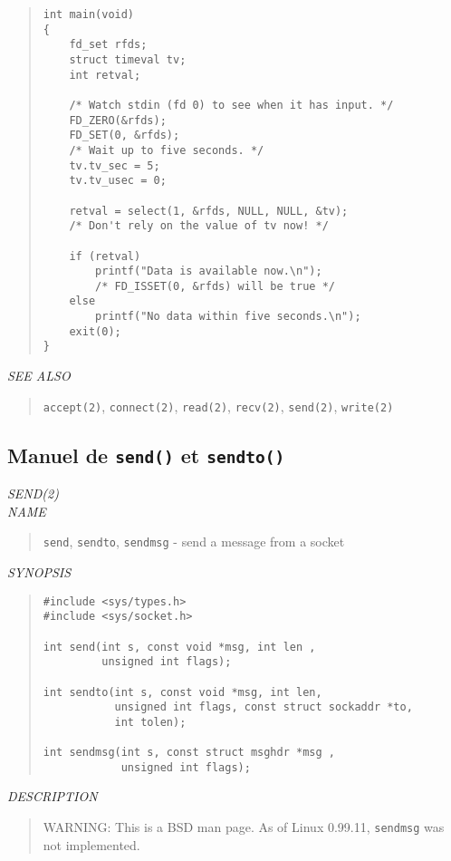 \begin{appendix}
\begin{english}
\begin{quote}
\begin{verbatim}
int main(void)
{
    fd_set rfds;
    struct timeval tv;
    int retval;

    /* Watch stdin (fd 0) to see when it has input. */
    FD_ZERO(&rfds);
    FD_SET(0, &rfds);
    /* Wait up to five seconds. */
    tv.tv_sec = 5;
    tv.tv_usec = 0;

    retval = select(1, &rfds, NULL, NULL, &tv);
    /* Don't rely on the value of tv now! */

    if (retval)
        printf("Data is available now.\n");
        /* FD_ISSET(0, &rfds) will be true */
    else
        printf("No data within five seconds.\n");
    exit(0);
}
\end{verbatim}
\end{quote}

{\sl SEE ALSO}
\begin{quote}
	{\tt accept(2)}, {\tt connect(2)}, {\tt read(2)}, {\tt recv(2)},
	{\tt send(2)}, {\tt write(2)}
\end{quote}
\end{english}


\subsection{Manuel de {\tt send()} et {\tt sendto()}}
\begin{english}
{\sl SEND(2)}\\

{\sl NAME}
\begin{quote}
	{\tt send}, {\tt sendto}, {\tt sendmsg} - send a message from a socket
\end{quote}

{\sl SYNOPSIS}
\begin{quote}
\begin{verbatim}
#include <sys/types.h>
#include <sys/socket.h>

int send(int s, const void *msg, int len ,
         unsigned int flags);

int sendto(int s, const void *msg, int len,
           unsigned int flags, const struct sockaddr *to,
           int tolen);

int sendmsg(int s, const struct msghdr *msg ,
            unsigned int flags);
\end{verbatim}
\end{quote}

{\sl DESCRIPTION}
\begin{quote}
	WARNING: This is a BSD man page. As of Linux 0.99.11, {\tt sendmsg}
	was not implemented.


\end{quote}
\end{english}
\end{appendix}
